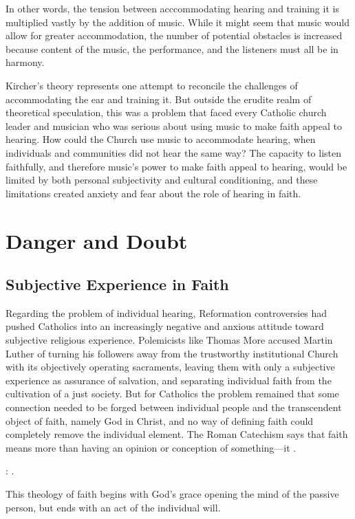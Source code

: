 In other words, the tension between acccommodating hearing and training it is multiplied vastly by the addition of music.
While it might seem that music would allow for greater accommodation, the number of potential obstacles is increased because content of the music, the performance, and the listeners must all be in harmony.

Kircher's theory represents one attempt to reconcile the challenges of accommodating the ear and training it. 
But outside the erudite realm of theoretical speculation, this was a problem that faced every Catholic church leader and musician who was serious about using music to make faith appeal to hearing.
How could the Church use music to accommodate hearing, when individuals and communities did not hear the same way? 
The capacity to listen faithfully, and therefore music's power to make faith appeal to hearing, would be limited by both personal subjectivity and cultural conditioning, and these limitations created anxiety and fear about the role of hearing in faith.

\section{Danger and Doubt}

\subsection{Subjective Experience in Faith}

Regarding the problem of individual hearing, Reformation controversies had pushed Catholics into an increasingly negative and anxious attitude toward subjective religious experience.
Polemicists like Thomas More accused Martin Luther of turning his followers away from the trustworthy institutional Church with its objectively operating sacraments, leaving them with only a subjective experience as assurance of salvation, and separating individual faith from the cultivation of a just society.%
    \Autocite[ch.~4]{Schreiner:Certainty}
But for Catholics the problem remained that some connection needed to be forged between individual people and the transcendent object of faith, namely God in Christ, and no way of defining faith could completely remove the individual element.
The Roman Catechism says that faith means more than having an opinion or conception of something---it .%
\begin{Footnote}
    \Autocite[15]{Catholic:Catechismus1614}: .
\end{Footnote}
This theology of faith begins with God's grace opening the mind of the passive person, but ends with an act of the individual will.

